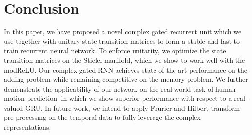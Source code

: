 \documentclass{article}
\begin{document}
\section{Conclusion}
In this paper, we have proposed a novel complex gated recurrent unit which we use together with unitary state transition matrices to form a stable and fast to train recurrent neural network.  To enforce unitarity, we optimize the state transition matrices on the Stiefel manifold, which we show to work well with the modReLU.  Our complex gated RNN achieves state-of-the-art performance on the adding problem while remaining competitive on the memory problem.  %
We further demonstrate the applicability of our network on the real-world task of human motion prediction, in which we show superior performance with respect to a real-valued GRU.  In future work, we intend to apply Fourier and Hilbert transform pre-processing on the temporal data to fully leverage the complex representations.


\end{document}
